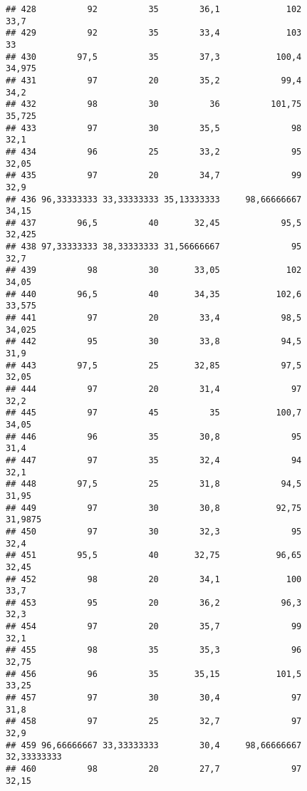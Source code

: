\documentclass[
]{article}
\begin{document}
\begin{verbatim}
## 428          92          35        36,1             102                 33,7
## 429          92          35        33,4             103                   33
## 430        97,5          35        37,3           100,4               34,975
## 431          97          20        35,2            99,4                 34,2
## 432          98          30          36          101,75               35,725
## 433          97          30        35,5              98                 32,1
## 434          96          25        33,2              95                32,05
## 435          97          20        34,7              99                 32,9
## 436 96,33333333 33,33333333 35,13333333     98,66666667                34,15
## 437        96,5          40       32,45            95,5               32,425
## 438 97,33333333 38,33333333 31,56666667              95                 32,7
## 439          98          30       33,05             102                34,05
## 440        96,5          40       34,35           102,6               33,575
## 441          97          20        33,4            98,5               34,025
## 442          95          30        33,8            94,5                 31,9
## 443        97,5          25       32,85            97,5                32,05
## 444          97          20        31,4              97                 32,2
## 445          97          45          35           100,7                34,05
## 446          96          35        30,8              95                 31,4
## 447          97          35        32,4              94                 32,1
## 448        97,5          25        31,8            94,5                31,95
## 449          97          30        30,8           92,75              31,9875
## 450          97          30        32,3              95                 32,4
## 451        95,5          40       32,75           96,65                32,45
## 452          98          20        34,1             100                 33,7
## 453          95          20        36,2            96,3                 32,3
## 454          97          20        35,7              99                 32,1
## 455          98          35        35,3              96                32,75
## 456          96          35       35,15           101,5                33,25
## 457          97          30        30,4              97                 31,8
## 458          97          25        32,7              97                 32,9
## 459 96,66666667 33,33333333        30,4     98,66666667          32,33333333
## 460          98          20        27,7              97                32,15

\end{verbatim}
\end{document}
